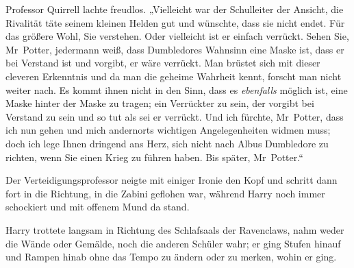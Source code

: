 Professor Quirrell lachte freudlos. „Vielleicht war der Schulleiter der Ansicht, die Rivalität täte seinem kleinen Helden gut und wünschte, dass sie nicht endet. Für das größere Wohl, Sie verstehen. Oder vielleicht ist er einfach verrückt. Sehen Sie, Mr~Potter, jedermann weiß, dass Dumbledores Wahnsinn eine Maske ist, dass er bei Verstand ist und vorgibt, er wäre verrückt. Man brüstet sich mit dieser cleveren Erkenntnis und da man die geheime Wahrheit kennt, forscht man nicht weiter nach. Es kommt ihnen nicht in den Sinn, dass es \emph{ebenfalls} möglich ist, eine Maske hinter der Maske zu tragen; ein Verrückter zu sein, der vorgibt bei Verstand zu sein und so tut als sei er verrückt. Und ich fürchte, Mr~Potter, dass ich nun gehen und mich andernorts wichtigen Angelegenheiten widmen muss; doch ich lege Ihnen dringend ans Herz, sich nicht nach Albus Dumbledore zu richten, wenn Sie einen Krieg zu führen haben. Bis später, Mr~Potter.“

Der Verteidigungsprofessor neigte mit einiger Ironie den Kopf und schritt dann fort in die Richtung, in die Zabini geflohen war, während Harry noch immer schockiert und mit offenem Mund da stand.


Harry trottete langsam in Richtung des Schlafsaals der Ravenclaws, nahm weder die Wände oder Gemälde, noch die anderen Schüler wahr; er ging Stufen hinauf und Rampen hinab ohne das Tempo zu ändern oder zu merken, wohin er ging.

